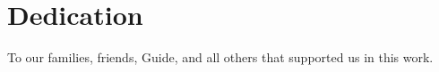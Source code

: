 \chapter*{Dedication}

\begin{center}
	\vspace{100mm}
	To our families, friends, Guide, and all others that supported us in this work. \\
\end{center}

